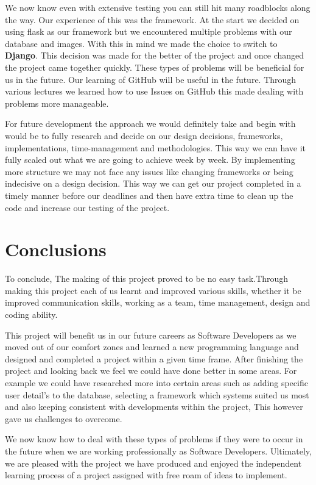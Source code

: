 \documentclass{article}
\begin{document}
\begin{flushleft}
\begin{flushleft}
We now know even with extensive testing you can still hit many roadblocks along the way. Our experience of this was the framework. At the start we decided on using flask as our framework but we encountered multiple problems with our database and images. With this in mind we made the choice to switch to \textbf{Django}. This decision was made for the better of the project and once changed the project came together quickly. These types of problems will be beneficial for us in the future. Our learning of GitHub will be useful in the future. Through various lectures we learned how to use Issues on GitHub this made dealing with problems more manageable.

For future development the approach we would definitely take and begin with would be to fully research and decide on our design decisions, frameworks, implementations, time-management and methodologies. This way we can have it fully scaled out what we are going to achieve week by week. By implementing more structure we may not face any issues like changing frameworks or being indecisive on a design decision. This way we can get our project completed in a timely manner before our deadlines and then have extra time to clean up the code and increase our testing of the project. 


\section{Conclusions}
To conclude, \newline
The making of this project proved to be no easy task.Through making this project each of us learnt and improved various skills, whether it be improved communication skills, working as a team, time management, design and coding ability.

This project will benefit us in our future careers as Software Developers as we moved out of our comfort zones and learned a new programming language and designed and completed a project within a given time frame. After finishing the project and looking back we feel we could have done better in some areas. For example we could have researched more into certain areas such as adding specific user detail's to the database, selecting a framework which systems suited us most and also keeping consistent with developments within the project, This however gave us challenges to overcome.

We now know how to deal with these types of problems if they were to occur in the future when we are working professionally as Software Developers. Ultimately, we are pleased with the project we have produced and enjoyed the independent learning process of a project assigned with free roam of ideas to implement.


\end{flushleft}
\end{flushleft}
\end{document}
